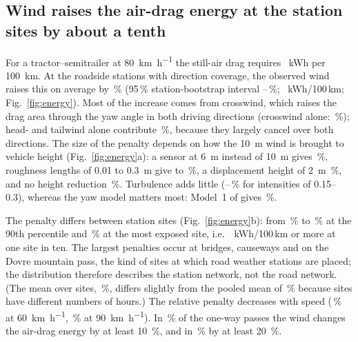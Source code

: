 \subsection{Wind raises the air-drag energy at the station sites by about a tenth}
\label{sec:res-energy}
For a tractor--semitrailer at \SI{80}{km.h^{-1}} the still-air drag requires \enEzero~kWh per \SI{100}{km}. At the \noDirOkN{} roadside stations with direction coverage, the observed wind raises this on average by \enAddNo\,\% (95\,\% station-bootstrap interval \enAddNoLo--\enAddNoHi\,\%; \enAddKwhNo~kWh/100\,km; Fig.~\ref{fig:energy}). Most of the increase comes from crosswind, which raises the drag area through the yaw angle in both driving directions (crosswind alone: \enCrossNo\,\%); head- and tailwind alone contribute \enHeadNo\,\%, because they largely cancel over both directions. The size of the penalty depends on how the \SI{10}{m} wind is brought to vehicle height (Fig.~\ref{fig:energy}a): a sensor at \SI{6}{m} instead of \SI{10}{m} gives \enBandNoSix\,\%, roughness lengths of 0.01 to \SI{0.3}{m} give \enBandNoZLow{} to \enBandNoZHigh\,\%, a displacement height of \SI{2}{m} \enBandNoDisp\,\%, and no height reduction \enBandNoNoRed\,\%. Turbulence adds little (\enBandNoTiLow--\enBandNoTiHigh\,\% for intensities of 0.15--0.3), whereas the yaw model matters most: Model~1 of \citet{Askerdal2024crosswind} gives \enAddNoMOne\,\%.

The penalty differs between station sites (Fig.~\ref{fig:energy}b): from \enRoadMinNo\,\% to \enRoadPninetyNo\,\% at the 90th percentile and \enRoadMaxNo\,\% at the most exposed site, i.e.\ \enRoadPninetyKwhNo~kWh/100\,km or more at one site in ten. The largest penalties occur at bridges, causeways and on the Dovre mountain pass, the kind of sites at which road weather stations are placed; the distribution therefore describes the station network, not the road network. (The mean over sites, \enRoadMeanNoTrue\,\%, differs slightly from the pooled mean of \enAddNo\,\% because sites have different numbers of hours.) The relative penalty decreases with speed (\enAddNoSixty\,\% at \SI{60}{km.h^{-1}}, \enAddNoNinety\,\% at \SI{90}{km.h^{-1}}). In \enStrongFracNo\,\% of the one-way passes the wind changes the air-drag energy by at least \SI{10}{\percent}, and in \enLargeFracNo\,\% by at least \SI{20}{\percent}.


